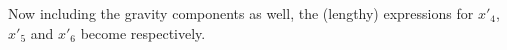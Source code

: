 
\noindent
Now including the gravity components as well, the (lengthy) expressions for $x'_{4}$, $x'_{5}$ and $x'_{6}$ become  respectively.

